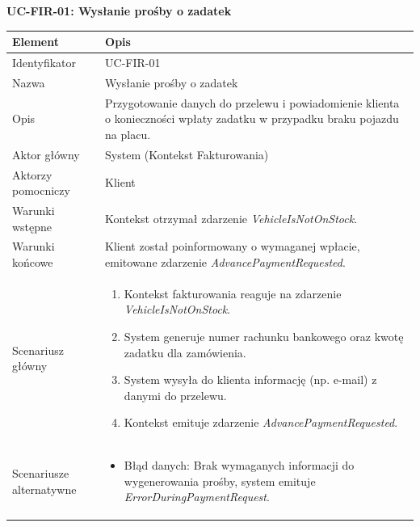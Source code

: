 \textbf{UC-FIR-01: Wysłanie prośby o zadatek}

\begin{longtable}{|p{4cm}|p{11cm}|}
\hline
\textbf{Element} & \textbf{Opis} \\
\hline

Identyfikator & UC-FIR-01 \\
\hline

Nazwa & Wysłanie prośby o zadatek \\
\hline

Opis & 
Przygotowanie danych do przelewu i powiadomienie klienta o konieczności wpłaty zadatku w przypadku braku pojazdu na placu. \\
\hline

Aktor główny & System (Kontekst Fakturowania) \\
\hline

Aktorzy pomocniczy & Klient \\
\hline

Warunki wstępne & 
Kontekst otrzymał zdarzenie \textit{VehicleIsNotOnStock}. \\
\hline

Warunki końcowe & 
Klient został poinformowany o wymaganej wpłacie, emitowane zdarzenie \textit{AdvancePaymentRequested}. \\
\hline

Scenariusz główny & 
\begin{enumerate}
    \item Kontekst fakturowania reaguje na zdarzenie \textit{VehicleIsNotOnStock}.
    \item System generuje numer rachunku bankowego oraz kwotę zadatku dla zamówienia.
    \item System wysyła do klienta informację (np. e-mail) z danymi do przelewu.
    \item Kontekst emituje zdarzenie \textit{AdvancePaymentRequested}.
\end{enumerate} \\
\hline

Scenariusze alternatywne & 
\begin{itemize}
    \item [A1] Błąd danych: Brak wymaganych informacji do wygenerowania prośby, system emituje \textit{ErrorDuringPaymentRequest}.
\end{itemize} \\
\hline
\end{longtable}

